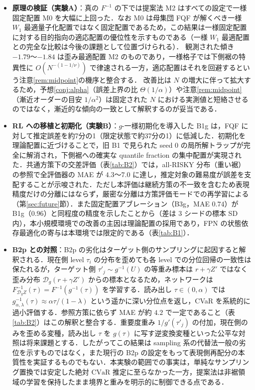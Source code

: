 \documentclass[a4paper,10pt]{jsarticle}
\theoremstyle{definition}
\newcommand{\CVaR}{\mathrm{CVaR}}
\newcommand{\Finv}{F^{-1}}
\newcommand{\dist}{\mathcal{D}_g}
\begin{document}
\begin{itemize}
  \item \textbf{原理の検証（実験A）}：真の $\Finv$ の下では提案法 M2 はすべての設定で一様固定配置 M0 を大幅に上回った．なお M0 は母集団 FQF が解くべき一様 $W_1$ 最適量子化配置ではなく固定配置であるため，この結果は一様固定配置に対する目的指向の適応配置の優位性を示すものである（一様 $W_1$ 最適配置との完全な比較は今後の課題として位置づけられる）．
  観測された傾き $-1.79$〜$-1.84$ は歪み最適配置 M2 のものであり，一様格子では下側裾の特異性に $O(N^{-(1-1/\nu)})$ で律速される一方，適応配置はそれを回避するという注意\ref{rem:midpoint}の機序と整合する．
  改善比は $N$ の増大に伴って拡大するため，予想\ref{conj:alpha}（誤差上界の比 $\Theta(1/\alpha)$）や注意\ref{rem:midpoint}（漸近オーダーの目安 $1/\alpha^2$）は固定された $N$ における実測値と短絡させるのではなく，漸近的な傾向の一致として解釈するのが妥当である．
  \item \textbf{RL への移植と初期化（実験B）}：$g$-一様初期化を導入した B1g は，FQF に対して推定誤差を約7分の1（限定状態で約37分の1）に低減した．初期化を理論配置に近づけることで，旧 B1 で見られた seed 0 の局所解トラップが完全に解消され，下側裾への確実な quantile fraction の集中配置が実現された．共通方策下の交差評価（表\ref{tab:B2}）では，all-RISKY 分布（重い裾）の参照で全評価器の MAE が $4.3$〜$7.0$ に達し，推定対象の難易度が誤差を支配することが示唆された．ただし本評価は継続方策の不一致を含むため表現精度だけの分離にはならず，厳密な分離は方策評価モードでの再学習による（第\ref{sec:future}節）．また固定配置アブレーション（B3g，MAE $0.74$）が B1g（$0.96$）と同程度の精度を示したことから（差は 3 シードの標本 SD 内），本小規模環境での改善の主因は理論配置の採用であり，FPN の状態依存最適化の寄与は本環境では限定的である（表\ref{tab:B1}）．
  \item \textbf{B2p との対照}：B2p の劣化はターゲット側のサンプリングに起因すると解釈される．現在側 level $\tau_i$ の分布を歪めても各 level での分位回帰の一致性は保たれるが，ターゲット側 $\tau'_j\sim g^{-1}(U)$ の等重み標本は $r+\gamma Z'$ ではなく歪み分布 $\dist(r+\gamma Z')$ からの標本となるため，ネットワークは $F^{-1}_{\dist Z}(\tau)=\Finv(g^{-1}(\tau))$ を学習する．読み出し $\tau\in(0,\alpha)$ では $g^{-1}_{\alpha,\lambda}(\tau)\approx\alpha\tau/(1-\lambda)$ という遥かに深い分位点を返し，CVaR を系統的に過小評価する．参照方策に依らず MAE が約 $4.2$ で一定であること（表\ref{tab:B2}）はこの解釈と整合する．重要度重み $1/g'(\tau'_j)$ の付加，現在側のみを歪める変種，読み出し $\tau$ を $g(\tau)$ に写す逆変換変種といった公平な対照は将来課題とする．したがってこの結果は sampling 系の代替法一般の劣位を示すものではなく，また現行の B2p の設定をもって表現側再配分の本質性を実証するものでもない．本実験の範囲での事実は，単純なサンプリング置換では安定した絶対 $\CVaR$ 推定に至らなかった一方，提案法は非裾領域の学習を保持したまま境界と重みを明示的に制御できる点である．

\end{itemize}
\end{document}
